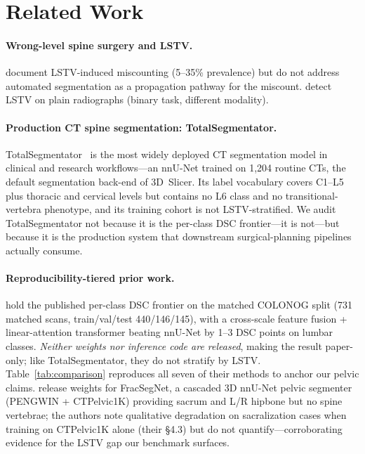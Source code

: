 \documentclass{article}
\newcommand{\TS}{TotalSegmentator}
\begin{document}
\section{Related Work}
\label{sec:related}

\paragraph{Wrong-level spine surgery and LSTV.}
\citep{Konin2010LumbosacralRelevance,Carrino2011EffectImaging,Sekharappa2014LumbosacralSignificance}
document LSTV-induced miscounting (5--35\% prevalence) but
do not address automated segmentation as a propagation
pathway for the miscount.
\citet{Kwak2025AutomatedModel} detect LSTV on plain
radiographs (binary task, different modality).

\paragraph{Production CT spine segmentation: \TS{}.}
\TS{}~\citep{Wasserthal2023TotalSegmentator:Images} is the
most widely deployed CT segmentation model in clinical and
research workflows---an nnU-Net trained on 1{,}204 routine
CTs, the default segmentation back-end of 3D~Slicer. Its
label vocabulary covers C1--L5 plus thoracic and cervical
levels but contains no L6 class and no
transitional-vertebra phenotype, and its training cohort
is not LSTV-stratified. We audit \TS{} not because it is
the per-class DSC frontier---it is not---but because it
is the production system that downstream surgical-planning
pipelines actually consume.

\paragraph{Reproducibility-tiered prior work.}
\citet{Li2025LumbarMechanism} hold the published
per-class DSC frontier on the matched COLONOG split
(731 matched scans, train/val/test 440/146/145), with
a cross-scale feature fusion + linear-attention
transformer beating nnU-Net by 1--3 DSC points on
lumbar classes. \emph{Neither weights nor inference
code are released}, making the result paper-only; like
\TS{}, they do not stratify by LSTV.
Table~\ref{tab:comparison} reproduces all seven of
their methods to anchor our pelvic claims.
\citet{Liu2025AutomaticDataset} release weights for
FracSegNet, a cascaded 3D nnU-Net pelvic segmenter
(PENGWIN + CTPelvic1K) providing sacrum and L/R hipbone
but no spine vertebrae; the authors note qualitative
degradation on sacralization cases when training on
CTPelvic1K alone (their \S4.3) but do not
quantify---corroborating evidence for the LSTV gap our
benchmark surfaces.
\end{document}

